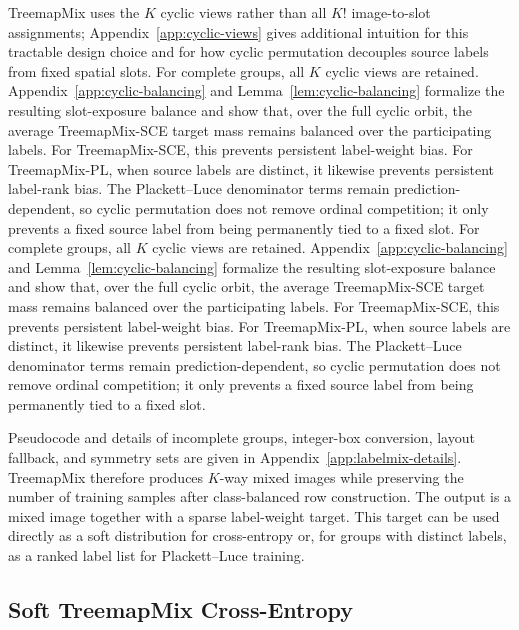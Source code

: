 TreemapMix uses the $K$ cyclic views rather than all $K!$ image-to-slot assignments; Appendix~\ref{app:cyclic-views} gives additional intuition for this tractable design choice and for how cyclic permutation decouples source labels from fixed spatial slots.
For complete groups, all $K$ cyclic views are retained. Appendix~\ref{app:cyclic-balancing} and Lemma~\ref{lem:cyclic-balancing} formalize the resulting slot-exposure balance and show that, over the full cyclic orbit, the average TreemapMix-SCE target mass remains balanced over the participating labels. For TreemapMix-SCE, this prevents persistent label-weight bias. For TreemapMix-PL, when source labels are distinct, it likewise prevents persistent label-rank bias. The Plackett--Luce denominator terms remain prediction-dependent, so cyclic permutation does not remove ordinal competition; it only prevents a fixed source label from being permanently tied to a fixed slot.
For complete groups, all $K$ cyclic views are retained. Appendix~\ref{app:cyclic-balancing} and Lemma~\ref{lem:cyclic-balancing} formalize the resulting slot-exposure balance and show that, over the full cyclic orbit, the average TreemapMix-SCE target mass remains balanced over the participating labels. For TreemapMix-SCE, this prevents persistent label-weight bias. For TreemapMix-PL, when source labels are distinct, it likewise prevents persistent label-rank bias. The Plackett--Luce denominator terms remain prediction-dependent, so cyclic permutation does not remove ordinal competition; it only prevents a fixed source label from being permanently tied to a fixed slot.

Pseudocode and details of incomplete groups, integer-box conversion, layout fallback, and symmetry sets are given in Appendix~\ref{app:labelmix-details}. TreemapMix therefore produces $K$-way mixed images while preserving the number of training samples after class-balanced row construction. The output is a mixed image together with a sparse label-weight target. This target can be used directly as a soft distribution for cross-entropy or, for groups with distinct labels, as a ranked label list for Plackett--Luce training.

\subsection{Soft TreemapMix Cross-Entropy}\label{sec:soft-ce}

